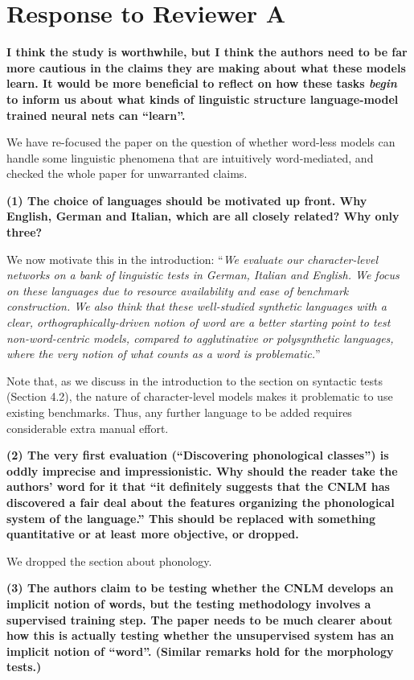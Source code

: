 \documentclass{article}[11pt,a4paper,oneside]
\begin{document}
\section{Response to Reviewer A}

\textbf{I think the study is worthwhile, but I think the authors need to be far more cautious in the claims they are making about what these models learn. It would be more beneficial to reflect on how these tasks \emph{begin} to inform us about what kinds of linguistic structure language-model trained neural nets can ``learn''.}

We have re-focused the paper on the question of whether word-less models can handle some linguistic phenomena that are intuitively word-mediated, and checked the whole paper for unwarranted claims.
\newline

\textbf{(1) The choice of languages should be motivated up front. Why English, German and Italian, which are all closely related? Why only three?}

We now motivate this in the introduction: ``\textit{We evaluate our character-level networks on a bank of linguistic tests in German, Italian and English. We focus on these languages due to resource availability and ease of benchmark construction. We also think that these well-studied synthetic languages with a clear, orthographically-driven notion of word are a better starting point to test non-word-centric models, compared to agglutinative or polysynthetic languages, where the very notion of what counts as a word is problematic.}''

Note that, as we discuss in the introduction to the section on syntactic tests (Section 4.2), the nature of character-level models makes it problematic to use existing benchmarks. Thus, any further language to be added requires considerable extra manual effort.
\newline

\textbf{(2) The very first evaluation (``Discovering phonological classes'') is oddly imprecise and impressionistic. Why should the reader take the authors' word for it that ``it definitely suggests that the CNLM has discovered a fair deal about the features organizing the phonological system of the language.'' This should be replaced with something quantitative or at least more objective, or dropped.}

We dropped the section about phonology.
\newline

\textbf{(3) The authors claim to be testing whether the CNLM develops an implicit notion of words, but the testing methodology involves a supervised training step. The paper needs to be much clearer about how this is actually testing whether the unsupervised system has an implicit notion of ``word''. (Similar remarks hold for the morphology tests.)}
\end{document}
